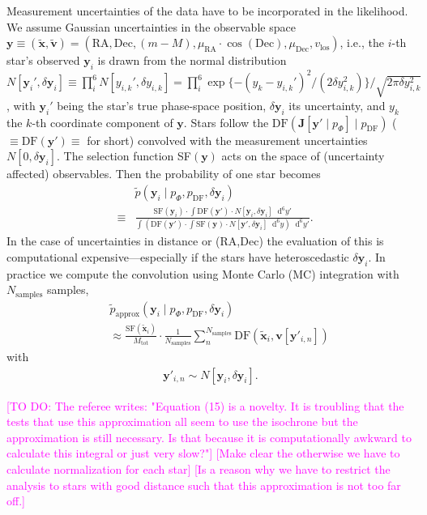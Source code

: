 \documentclass[iop,revtex4]{emulateapj}
\newcommand{\vect}[1]{\boldsymbol{#1}}
\newcommand*\Diff[1]{\mathop{}\!\mathrm{d^#1}}
\newcommand{\Wilma}[1]{\textcolor{Magenta}{#1}}
\begin{document}
Measurement uncertainties of the data have to be incorporated in the likelihood. We assume Gaussian uncertainties in the observable space $\vect{y} \equiv (\tilde{\vect{x}},\tilde{\vect{v}})=(\text{RA},\text{Dec},(m-M),\mu_\text{RA} \cdot \cos (\text{Dec}),\mu_\text{Dec},v_\text{los})$, i.e., the $i$-th star's observed $\vect{y}_i$ is drawn from the normal distribution $N[{\vect{y}_i}',\delta \vect{y}_i] \equiv \prod_i^6 N[{y_{i,k}}',\delta y_{i,k}] =  \prod_i^6 \exp \{-(y_{k}-{y_{i,k}}')^2/ (2 \delta y_{i,k}^2) \} / \sqrt{2 \pi \delta y_{i,k}^2}$, with ${\vect{y}_i}'$ being the star's true phase-space position, $\delta \vect{y}_i$ its uncertainty, and $y_k$ the $k$-th coordinate component of $\vect{y}$. Stars follow the $\text{DF}(\vect{J}[\vect{y}' \mid p_\Phi] \mid p_\text{DF})$ ($\equiv \text{DF}(\vect{y}') \equiv$  for short) convolved with the measurement uncertainties $N[0,\delta \vect{y}_i]$. The selection function SF$(\vect{y})$ acts on the space of (uncertainty affected) observables. Then the probability of one star becomes
\begin{eqnarray}
&&\tilde{p}(\vect{y}_i \mid p_\Phi,p_\text{DF},\delta \vect{y}_i)\nonumber\\
& \equiv& \frac{\text{SF}(\vect{y}_i) \cdot \int \text{DF}(\vect{y}') \cdot N[\vect{y}_i,\delta \vect{y}_i] \Diff{6} y'}{\int \left(  \text{DF}(\vect{y}')  \cdot  \int \text{SF}(\vect{y})  \cdot N[\vect{y}',\delta \vect{y}_i] \Diff{6} y \right) \Diff{6}y'}.
\end{eqnarray}
In the case of uncertainties in distance or (RA,Dec) the evaluation of this is computational expensive---especially if the stars have heteroscedastic $\delta \vect{y}_i$. In practice we compute the convolution using Monte Carlo (MC) integration with $N_\text{samples}$ samples,
\begin{eqnarray}
&&\tilde{p}_\text{approx}(\vect{y}_i \mid p_\Phi,p_\text{DF},\delta \vect{y}_i) \nonumber\\
&&\approx \frac{ \text{SF}(\tilde{\vect{x}}_i)}{M_\text{tot}} \cdot \frac{1}{N_\text{samples}} \sum_n^{N_\text{samples}}  \text{DF}(\tilde{\vect{x}}_i,\vect{v}[\vect{y}'_{i,n}]) \label{eq:errorconv}
\end{eqnarray}
with
\begin{eqnarray}
\vect{y}'_{i,n} \sim N[\vect{y}_i,\delta \vect{y}_i].\nonumber
\end{eqnarray}

\Wilma{[TO DO: The referee writes: "Equation (15) is a novelty. It is troubling that the tests that use this approximation all seem to use the isochrone but the approximation is still necessary. Is that because it is computationally awkward to calculate this integral or just very slow?"] [Make clear the otherwise we have to calculate normalization for each star] [Is a reason why we have to restrict the analysis to stars with good distance such that this approximation is not too far off.]}
\end{document}
